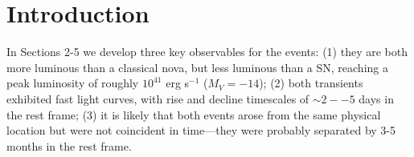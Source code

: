 \section{Introduction}\label{sec:Introduction}



In Sections 2-5 we develop three key observables for the \spock
events: (1) they are both more luminous than a classical nova, but
less luminous than a SN, reaching a peak luminosity of roughly
$10^{41}$ erg s$^{−1}$ ($M_V=−14$); (2) both transients exhibited fast
light curves, with rise and decline timescales of $\sim2--5$ days in
the rest frame; (3) it is likely that both events arose from the same
physical location but were not coincident in time---they were probably
separated by 3-5 months in the rest frame.
 

  
